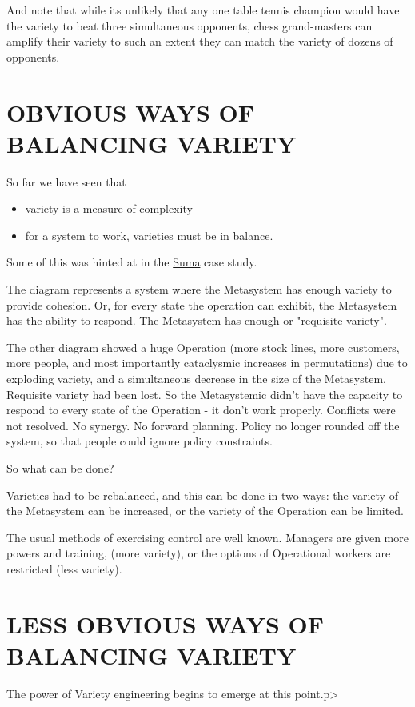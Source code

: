 And note that while its unlikely that any one table tennis champion would have the variety to beat three simultaneous opponents, chess grand-masters can amplify their variety to such an extent they can match the variety of dozens of opponents.

\section*{OBVIOUS WAYS OF BALANCING VARIETY}
So far we have seen that

\begin{itemize}
  \item variety is a measure of complexity

  \item for a system to work, varieties must be in balance.

\end{itemize}

Some of this was hinted at in the \href{https://vsmg.lrc.org.uk/screen.php?page=2_2cs2}{Suma} case study.

The diagram represents a system where the Metasystem has enough variety to provide cohesion. Or, for every state the operation can exhibit, the Metasystem has the ability to respond. The Metasystem has enough or "requisite variety".

The other diagram showed a huge Operation (more stock lines, more customers, more people, and most importantly cataclysmic increases in permutations) due to exploding variety, and a simultaneous decrease in the size of the Metasystem. Requisite variety had been lost. So the Metasystemic didn't have the capacity to respond to every state of the Operation - it don't work properly. Conflicts were not resolved. No synergy. No forward planning. Policy no longer rounded off the system, so that people could ignore policy constraints.

So what can be done?

Varieties had to be rebalanced, and this can be done in two ways: the variety of the Metasystem can be increased, or the variety of the Operation can be limited.

The usual methods of exercising control are well known. Managers are given more powers and training, (more variety), or the options of Operational workers are restricted (less variety).


\section*{LESS OBVIOUS WAYS OF BALANCING VARIETY}
The power of Variety engineering begins to emerge at this point.p>

